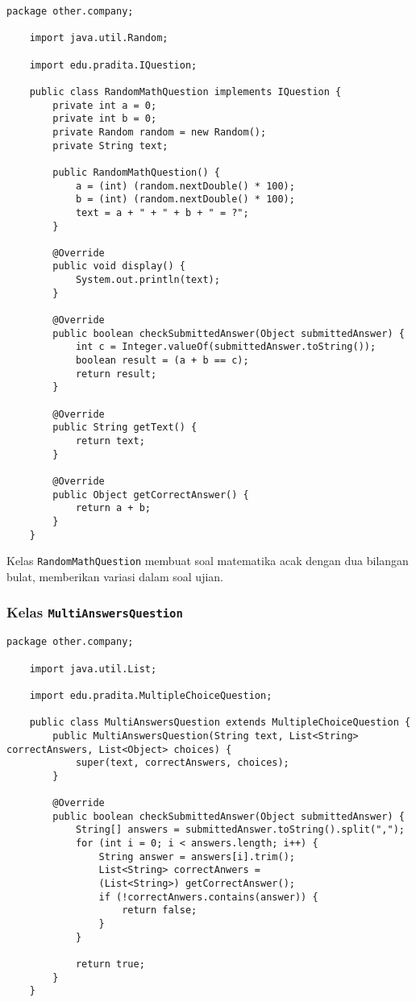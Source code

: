 \begin{lstlisting}[style=JavaStyle]
	package other.company;
	
	import java.util.Random;
	
	import edu.pradita.IQuestion;
	
	public class RandomMathQuestion implements IQuestion {
		private int a = 0;
		private int b = 0;
		private Random random = new Random();
		private String text;
		
		public RandomMathQuestion() {
			a = (int) (random.nextDouble() * 100);
			b = (int) (random.nextDouble() * 100);
			text = a + " + " + b + " = ?";
		}
		
		@Override
		public void display() {
			System.out.println(text);
		}
		
		@Override
		public boolean checkSubmittedAnswer(Object submittedAnswer) {
			int c = Integer.valueOf(submittedAnswer.toString());
			boolean result = (a + b == c);
			return result;
		}
		
		@Override
		public String getText() {
			return text;
		}
		
		@Override
		public Object getCorrectAnswer() {
			return a + b;
		}
	}
\end{lstlisting}

Kelas \texttt{RandomMathQuestion} membuat soal matematika acak dengan dua bilangan bulat, memberikan variasi dalam soal ujian.

\subsubsection{Kelas \texttt{MultiAnswersQuestion}}

\begin{lstlisting}[style=JavaStyle]
	package other.company;
	
	import java.util.List;
	
	import edu.pradita.MultipleChoiceQuestion;
	
	public class MultiAnswersQuestion extends MultipleChoiceQuestion {
		public MultiAnswersQuestion(String text, List<String> correctAnswers, List<Object> choices) {
			super(text, correctAnswers, choices);
		}
		
		@Override
		public boolean checkSubmittedAnswer(Object submittedAnswer) {
			String[] answers = submittedAnswer.toString().split(",");
			for (int i = 0; i < answers.length; i++) {
				String answer = answers[i].trim();
				List<String> correctAnwers = 
				(List<String>) getCorrectAnswer();
				if (!correctAnwers.contains(answer)) {
					return false;
				}
			}
			
			return true;
		}
	}
\end{lstlisting}

